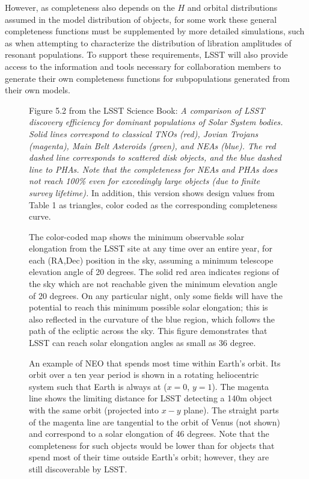\documentclass[manuscript]{aastex}
\begin{document}
However, as completeness also depends on the $H$ and orbital distributions assumed in the model distribution of objects, for some work these general completeness functions must be supplemented by more detailed simulations, such as when attempting to characterize the distribution of libration amplitudes of resonant populations. To support these requirements, LSST will also provide access to the information and tools necessary for collaboration members to generate their own completeness functions for subpopulations generated from their own models. 



\begin{figure}[h!]
\vskip -1.3in
\vskip -1.0in
\caption{Figure 5.2 from the LSST Science Book: {\it A comparison of LSST discovery efficiency for dominant 
populations of Solar System bodies. Solid lines correspond to 
classical TNOs (red), Jovian Trojans (magenta), Main Belt Asteroids
(green), and NEAs (blue). The red dashed line corresponds to 
scattered disk objects, and the blue dashed line to PHAs. Note that
the completeness for NEAs and PHAs does not reach 100\% even for
exceedingly large objects (due to finite survey lifetime).}
In addition, this version shows design values from Table 1 as triangles,
color coded as the corresponding completeness curve. 
\label{fig:C}
}
\end{figure}



\begin{figure}[t!]
\vskip -2.3in
\vskip -1.6in
\caption{
The color-coded map shows the minimum observable solar elongation from the LSST site at any time over 
an entire year, for each (RA,Dec) position in the sky, assuming a minimum telescope elevation angle of 20 degrees.
The solid red area indicates regions of the sky which are not reachable given the minimum elevation angle of 
20 degrees. On any particular night, only some fields will have the potential to reach this minimum possible 
solar elongation; this is also reflected in the curvature of the blue region, which follows the path of the ecliptic 
across the sky. This figure demonstrates that LSST can reach solar elongation angles
as small as 36 degree.
\label{fig:minang}
}
\end{figure}


\begin{figure}[b!]
\vskip -1.3in
\vskip -1.0in
\caption{An example of NEO that spends most time within Earth's orbit. Its orbit over a ten year period is
shown in a rotating heliocentric system such that Earth is always at ($x=0$, $y=1$). The magenta line shows the limiting 
distance for LSST detecting a 140m object with the same orbit (projected into $x-y$ plane). The straight 
parts of the magenta line are tangential to the orbit of Venus (not shown) and correspond to a solar elongation
of 46 degrees. Note that the completeness for such objects would be lower than for objects that spend most of their
time outside Earth's orbit; however, they are still discoverable by LSST. 
\label{fig:volume}
}
\end{figure}
\end{document}
